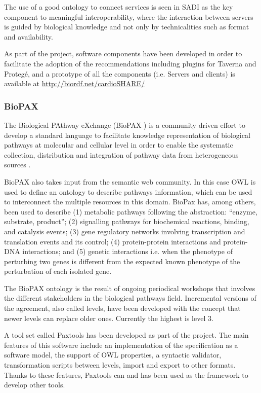 The use of a good ontology to connect services is seen in SADI as the key component to meaningful interoperability, where the interaction between servers is guided by biological knowledge and not only by technicalities such as format and availability.

As part of the project, software components have been developed in order to facilitate the adoption of the recommendations including plugins for Taverna and Protegé, and a  prototype of all the components (i.e. Servers and clients) is available at \url{http://biordf.net/cardioSHARE/}

\subsubsection{BioPAX}
The Biological PAthway eXchange (BioPAX ) is a community driven effort to develop a standard language to facilitate knowledge representation of biological pathways at molecular and cellular level in order to enable the systematic collection, distribution and integration of pathway data from heterogeneous sources \cite{DEM2010}.

BioPAX also takes input from the semantic web community. In this case OWL is used to define an ontology to describe pathways information, which can be used to interconnect the multiple resources in this domain. BioPax has, among others, been used to describe (1) metabolic pathways following the abstraction: ``enzyme, substrate, product''; (2) signalling pathways for biochemical reactions, binding, and catalysis events; (3) gene regulatory networks involving transcription and translation events and its control; (4) protein-protein interactions and protein-DNA interactions; and (5) genetic interactions i.e. when the phenotype of perturbing two genes is different from the expected known phenotype of the perturbation of each isolated gene.

The BioPAX ontology is the result of ongoing periodical workshops that involves the different stakeholders in the biological pathways field. Incremental versions of the agreement, also called levels, have been developed with the concept that newer levels can replace older ones. Currently the highest  is level 3.

A tool set called Paxtools has been developed as part of the project. The main features of this software include an implementation of the specification as a software model, the support of OWL properties, a syntactic validator, transformation scripts between levels, import and export to other formats. Thanks to these features, Paxtools can and has been used as the framework to develop other tools.

